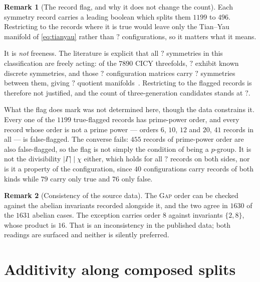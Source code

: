 \documentclass[11pt,a4paper]{article}
\newcommand{\FactGenWithSymmetry}{?}\newcommand{\FactGenRecords}{?}
\newcommand{\FactGenHits}{?}\newcommand{\FactGenMinEuler}{?}
\theoremstyle{definition}
\newtheorem{remark}{Remark}
\begin{document}
\begin{remark}[The record flag, and why it does not change the count]
\label{rem:flag}
Each symmetry record carries a leading boolean which splits them $1199$ to
$496$. Restricting to the records where it is true would leave only the
Tian--Yau manifold of \cref{eq:tianyau} rather than $\FactGenHits$
configurations, so it matters what it means.

It is \emph{not} freeness. The literature is explicit that all
$\FactGenRecords$ symmetries in this classification are freely acting: of the
$7890$ CICY threefolds, $\FactGenWithSymmetry$ exhibit known discrete
symmetries, and those $\FactGenWithSymmetry$ configuration matrices carry
$\FactGenRecords$ symmetries between them, giving $\FactGenRecords$ quotient
manifolds~\cite{Braun2010,ConstantinGrayLukas2017,AndersonFibrations2018,%
LukasMishra2020}. Restricting to the flagged records is therefore not
justified, and the count of three-generation candidates stands at
$\FactGenHits$.

What the flag does mark was not determined here, though the data constrains
it. Every one of the $1199$ true-flagged records has prime-power order, and
every record whose order is not a prime power --- orders $6$, $10$, $12$ and
$20$, $41$ records in all --- is false-flagged. The converse fails: $455$
records of prime-power order are also false-flagged, so the flag is not
simply the condition of being a $p$-group. It is not the divisibility
$|\Gamma| \mid \chi$ either, which holds for all $\FactGenRecords$ records on
both sides, nor is it a property of the configuration, since $40$
configurations carry records of both kinds while $79$ carry only true and
$76$ only false.
\end{remark}

\begin{remark}[Consistency of the source data]
The \textsc{Gap} order can be checked against the abelian invariants recorded
alongside it, and the two agree in $1630$ of the $1631$ abelian cases. The
exception carries order $8$ against invariants $\{2,8\}$, whose product is
$16$. That is an inconsistency in the published data; both readings are
surfaced and neither is silently preferred.
\end{remark}

\section{Additivity along composed splits}
\label{sec:additivity}
\end{document}
